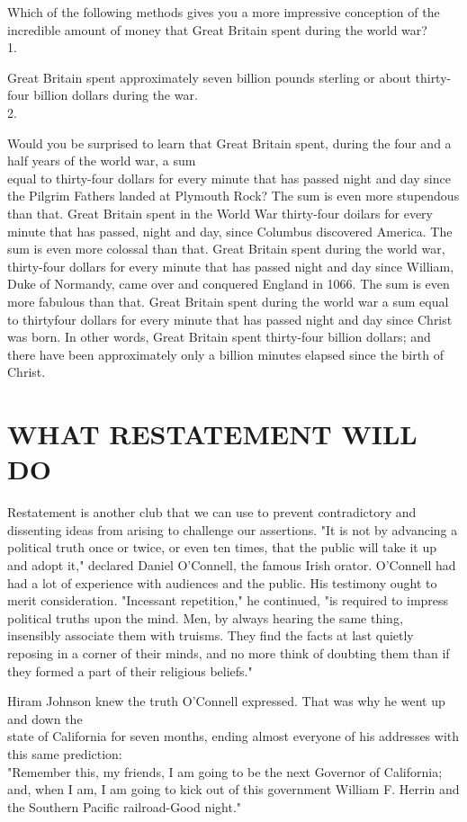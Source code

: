 \documentclass[10pt]{article}
\begin{document}
Which of the following methods gives you a more impressive conception of the incredible amount of money that Great Britain spent during the world war?\\
1.

Great Britain spent approximately seven billion pounds sterling or about thirty-four billion dollars during the war.\\
2.

Would you be surprised to learn that Great Britain spent, during the four and a half years of the world war, a sum\\
equal to thirty-four dollars for every minute that has passed night and day since the Pilgrim Fathers landed at Plymouth Rock? The sum is even more stupendous than that. Great Britain spent in the World War thirty-four doilars for every minute that has passed, night and day, since Columbus discovered America. The sum is even more colossal than that. Great Britain spent during the world war, thirty-four dollars for every minute that has passed night and day since William, Duke of Normandy, came over and conquered England in 1066. The sum is even more fabulous than that. Great Britain spent during the world war a sum equal to thirtyfour dollars for every minute that has passed night and day since Christ was born. In other words, Great Britain spent thirty-four billion dollars; and there have been approximately only a billion minutes elapsed since the birth of Christ.

\section*{WHAT RESTATEMENT WILL DO}
Restatement is another club that we can use to prevent contradictory and dissenting ideas from arising to challenge our assertions. "It is not by advancing a political truth once or twice, or even ten times, that the public will take it up and adopt it," declared Daniel O'Connell, the famous Irish orator. O'Connell had had a lot of experience with audiences and the public. His testimony ought to merit consideration. "Incessant repetition," he continued, "is required to impress political truths upon the mind. Men, by always hearing the same thing, insensibly associate them with truisms. They find the facts at last quietly reposing in a corner of their minds, and no more think of doubting them than if they formed a part of their religious beliefs."

Hiram Johnson knew the truth O'Connell expressed. That was why he went up and down the\\
state of California for seven months, ending almost everyone of his addresses with this same prediction:\\
"Remember this, my friends, I am going to be the next Governor of California; and, when I am, I am going to kick out of this government William F. Herrin and the Southern Pacific railroad-Good night."
\end{document}
